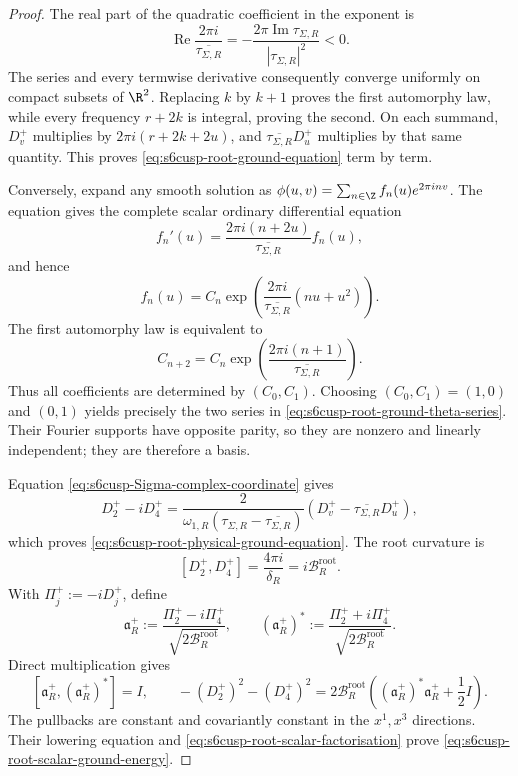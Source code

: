 \begin{proof}
The real part of the quadratic coefficient in the exponent is
\[
 \operatorname{Re}\frac{2\pi i}{\overline{\tau_{\Sigma,R}}}
 =-\frac{2\pi\operatorname{Im}\tau_{\Sigma,R}}
 {|\tau_{\Sigma,R}|^2}<0.
\]
The series and every termwise derivative consequently converge uniformly on
compact subsets of \(\R^2\).  Replacing \(k\) by \(k+1\) proves the first
automorphy law, while every frequency \(r+2k\) is integral, proving the
second.  On each summand, \(D_v^+\) multiplies by
\(2\pi i(r+2k+2u)\), and
\(\overline{\tau_{\Sigma,R}}D_u^+\) multiplies by that same quantity.
This proves \eqref{eq:s6cusp-root-ground-equation} term by term.

Conversely, expand any smooth solution as
\(\phi(u,v)=\sum_{n\in\Z}f_n(u)e^{2\pi inv}\).  The equation gives the
complete scalar ordinary differential equation
\begin{equation}\label{eq:s6cusp-root-fourier-ode}
 f_n'(u)=\frac{2\pi i(n+2u)}
 {\overline{\tau_{\Sigma,R}}}f_n(u),
\end{equation}
and hence
\[
 f_n(u)=C_n
 \exp\!\left(
  \frac{2\pi i}{\overline{\tau_{\Sigma,R}}}(nu+u^2)
 \right).
\]
The first automorphy law is equivalent to
\begin{equation}\label{eq:s6cusp-root-coefficient-recurrence}
 C_{n+2}=C_n
 \exp\!\left(
  \frac{2\pi i(n+1)}{\overline{\tau_{\Sigma,R}}}
 \right).
\end{equation}
Thus all coefficients are determined by \((C_0,C_1)\).  Choosing
\((C_0,C_1)=(1,0)\) and \((0,1)\) yields precisely the two series in
\eqref{eq:s6cusp-root-ground-theta-series}.  Their Fourier supports have
opposite parity, so they are nonzero and linearly independent; they are
therefore a basis.

Equation \eqref{eq:s6cusp-Sigma-complex-coordinate} gives
\begin{equation}\label{eq:s6cusp-root-coordinate-derivative-map}
 D_2^+-iD_4^+
 =\frac{2}{\omega_{1,R}
 (\tau_{\Sigma,R}-\overline{\tau_{\Sigma,R}})}
 (D_v^+-\overline{\tau_{\Sigma,R}}D_u^+),
\end{equation}
which proves \eqref{eq:s6cusp-root-physical-ground-equation}.  The root
curvature is
\[
 [D_2^+,D_4^+]
 =\frac{4\pi i}{\delta_R}
 =i\mathcal B_R^{\mathrm{root}}.
\]
With \(\Pi_j^+:=-iD_j^+\), define
\[
 \mathfrak a_R^+
 :=\frac{\Pi_2^+-i\Pi_4^+}
 {\sqrt{2\mathcal B_R^{\mathrm{root}}}},
 \qquad
 (\mathfrak a_R^+)^*
 :=\frac{\Pi_2^++i\Pi_4^+}
 {\sqrt{2\mathcal B_R^{\mathrm{root}}}}.
\]
Direct multiplication gives
\begin{equation}\label{eq:s6cusp-root-scalar-factorisation}
 [\mathfrak a_R^+,(\mathfrak a_R^+)^*]=I,
 \qquad
 -(D_2^+)^2-(D_4^+)^2
 =2\mathcal B_R^{\mathrm{root}}
 \left((\mathfrak a_R^+)^*\mathfrak a_R^++\frac12I\right).
\end{equation}
The pullbacks are constant and covariantly constant in the
\(x^1,x^3\) directions.  Their lowering equation and
\eqref{eq:s6cusp-root-scalar-factorisation} prove
\eqref{eq:s6cusp-root-scalar-ground-energy}.
\end{proof}

